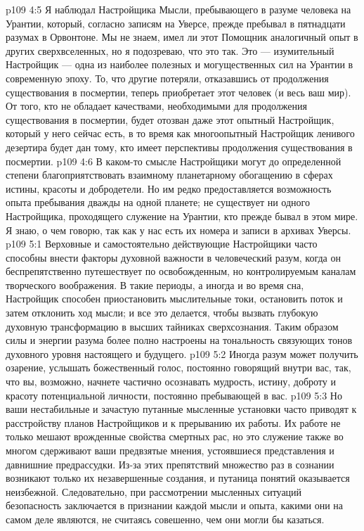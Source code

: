 \vs p109 4:5 \pc Я наблюдал Настройщика Мысли, пребывающего в разуме человека на Урантии, который, согласно записям на Уверсе, прежде пребывал в пятнадцати разумах в Орвонтоне. Мы не знаем, имел ли этот Помощник аналогичный опыт в других сверхвселенных, но я подозреваю, что это так. Это --- изумительный Настройщик --- одна из наиболее полезных и могущественных сил на Урантии в современную эпоху. То, что другие потеряли, отказавшись от продолжения существования в посмертии, теперь приобретает этот человек (и весь ваш мир). От того, кто не обладает качествами, необходимыми для продолжения существования в посмертии, будет отозван даже этот опытный Настройщик, который у него сейчас есть, в то время как многоопытный Настройщик ленивого дезертира будет дан тому, кто имеет перспективы продолжения существования в посмертии.
\vs p109 4:6 В каком\hyp{}то смысле Настройщики могут до определенной степени благоприятствовать взаимному планетарному обогащению в сферах истины, красоты и добродетели. Но им редко предоставляется возможность опыта пребывания дважды на одной планете; не существует ни одного Настройщика, проходящего служение на Урантии, кто прежде бывал в этом мире. Я знаю, о чем говорю, так как у нас есть их номера и записи в архивах Уверсы.
\vs p109 5:1 Верховные и самостоятельно действующие Настройщики часто способны внести факторы духовной важности в человеческий разум, когда он беспрепятственно путешествует по освобожденным, но контролируемым каналам творческого воображения. В такие периоды, а иногда и во время сна, Настройщик способен приостановить мыслительные токи, остановить поток и затем отклонить ход мысли; и все это делается, чтобы вызвать глубокую духовную трансформацию в высших тайниках сверхсознания. Таким образом силы и энергии разума более полно настроены на тональность связующих тонов духовного уровня настоящего и будущего.
\vs p109 5:2 Иногда разум может получить озарение, услышать божественный голос, постоянно говорящий внутри вас, так, что вы, возможно, начнете частично осознавать мудрость, истину, доброту и красоту потенциальной личности, постоянно пребывающей в вас.
\vs p109 5:3 Но ваши нестабильные и зачастую путанные мысленные установки часто приводят к расстройству планов Настройщиков и к прерыванию их работы. Их работе не только мешают врожденные свойства смертных рас, но это служение также во многом сдерживают ваши предвзятые мнения, устоявшиеся представления и давнишние предрассудки. Из\hyp{}за этих препятствий множество раз в сознании возникают только их незавершенные создания, и путаница понятий оказывается неизбежной. Следовательно, при рассмотрении мысленных ситуаций безопасность заключается в признании каждой мысли и опыта, какими они на самом деле являются, не считаясь совешенно, чем они могли бы казаться.
